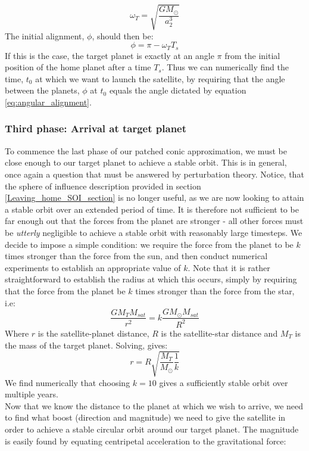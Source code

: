 \documentclass[a4paper,10pt,english]{article}
\begin{document}
\begin{equation}
\omega_T=\sqrt{\frac{GM_{\odot}}{a_2^3}}
\end{equation}
The initial alignment, $\phi$, should then be:
\begin{equation}\label{eq:angular_alignment}
\phi = \pi - \omega_TT_s
\end{equation}
If this is the case, the target planet is exactly at an angle $\pi$ from the initial position of the home planet after a time $T_s$. Thus we can numerically find the time, $t_0$ at which we want to launch the satellite, by requiring that the angle between the planets, $\phi$ at $t_0$ equals the angle dictated by equation \ref{eq:angular_alignment}.
\subsubsection{Third phase: Arrival at target planet}\label{arriving_at_planet_section}
To commence the last phase of our patched conic approximation, we must be close enough to our target planet to achieve a stable orbit. This is in general, once again a question that must be answered by perturbation theory. Notice, that the sphere of influence description provided in section \ref{Leaving_home_SOI_section} is no longer useful, as we are now looking to attain a stable orbit over an extended period of time. It is therefore not sufficient to be far enough out that the forces from the planet are stronger - all other forces must be \textit{utterly} negligible to achieve a stable orbit with reasonably large timesteps. We decide to impose a simple condition: we require the force from the planet to be $k$ times stronger than the force from the sun, and then conduct numerical experiments to establish an appropriate value of $k$. Note that it is rather straightforward to establish the radius at which this occurs, simply by requiring that the force from the planet be $k$ times stronger than the force from the star, i.e:
$$\frac{GM_TM_{sat}}{r^2}=k\frac{GM_{\odot}M_{sat}}{R^2}$$
Where $r$ is the satellite-planet distance, $R$ is the satellite-star distance and $M_T$ is the mass of the target planet. Solving, gives:
\begin{equation}\label{eq:part3_k_equation}
r=R\sqrt{\frac{M_T}{M_{\odot}}\frac{1}{k}}
\end{equation}
We find numerically that choosing $k=10$ gives a sufficiently stable orbit over multiple years.\\
\linebreak
Now that we know the distance to the planet at which we wish to arrive, we need to find what boost (direction and magnitude) we need to give the satellite in order to achieve a stable circular orbit around our target  planet. The magnitude is easily found by equating centripetal acceleration to the gravitational force:
\end{document}
